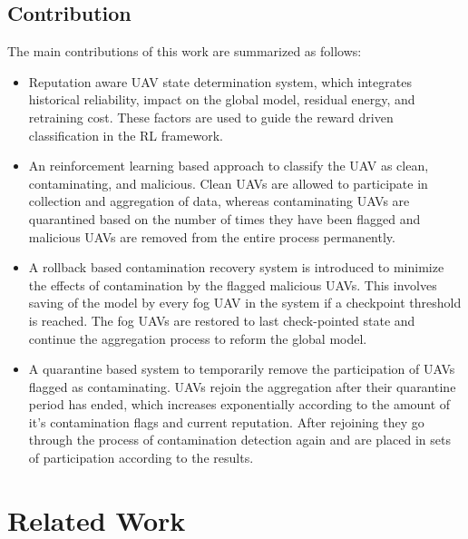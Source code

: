 \documentclass[10pt,journal,compsoc]{IEEEtran}
\begin{document}
\subsection{Contribution}
The main contributions of this work are summarized as follows:
\begin{itemize}


 \item Reputation aware UAV state determination system, which integrates historical reliability, impact on the global model, residual energy, and retraining cost. These factors are used to guide the reward driven classification in the RL framework.

\item An reinforcement learning based approach to classify the UAV as clean, contaminating, and malicious. Clean UAVs are allowed to participate in collection and aggregation of data, whereas contaminating UAVs are quarantined based on the number of times they have been flagged and malicious UAVs are removed from the entire process permanently.

\item A rollback based contamination recovery system is introduced to minimize the effects of contamination by the flagged malicious UAVs. This involves saving of the model by every fog UAV in the system if a checkpoint threshold is reached. The fog UAVs are restored to last check-pointed state and continue the aggregation process to reform the global model.

\item A quarantine based system to temporarily remove the participation of UAVs flagged as contaminating. UAVs rejoin the aggregation after their quarantine period has ended, which increases exponentially according to the amount of it's contamination flags and current reputation. After rejoining they go through the process of contamination detection again and are placed in sets of participation according to the results. 

\end{itemize}

%
%
%
\section{Related Work}
\end{document}
